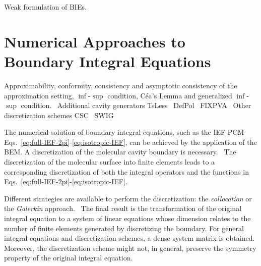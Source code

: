 Weak formulation of \acs{BIE}s.\autocite{Hsiao2008-xb}


\section{Numerical Approaches to Boundary Integral Equations}\label{sec:BEM}

Approximability, conformity, consistency and asymptotic consistency
of the approximation setting, $\inf$-$\sup$ condition, Céa's Lemma
and generalized $\inf$-$\sup$ condition.~\autocite{Ern2004-oo,
TesiFilippo}
Additional cavity generators
TsLess~\autocite{Pomelli2004-lb}
DefPol~\autocite{Pomelli1998-ob, Pomelli1999-dc}
FIXPVA~\autocite{Su2009-em}
Other discretization schemes
CSC~\autocite{York1999-xy, Scalmani2010-tw}
SWIG~\autocite{Lange2010-jp, Lange2010-qo, Lange2011-eu}


The numerical solution of boundary integral equations, such as the
\acs{IEF}-\acs{PCM}
Eqs.~\eqref{eq:full-IEF-2pi}-\eqref{eq:isotropic-IEF}, can be achieved
by the application of the \ac{BEM}.
A discretization of the molecular cavity
boundary is necessary.~\autocite{Pomelli2007-wq}
The discretization of the
molecular surface into finite elements leads to a corresponding
discretization of both the integral operators and the functions in
Eqs.~\eqref{eq:full-IEF-2pi}-\eqref{eq:isotropic-IEF}.

Different strategies are available to perform the
discretization: the \emph{collocation} or the \emph{Galerkin}
approach.~\cite{Hackbusch1995-uq, Ern2004-oo}
The final result is the transformation of
the original integral equation to a system of linear equations whose
dimension relates to the number of finite elements generated by
discretizing the boundary.  For general integral equations and
discretization schemes, a dense system matrix is obtained. Moreover, the
discretization scheme might not, in general, preserve the symmetry
property of the original integral equation.

